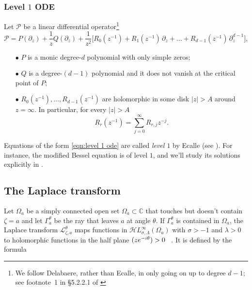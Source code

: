 \documentclass{article}
\theoremstyle{plain}
\newcommand{\C}{\mathbb{C}}
\let\Re\relax
\DeclareMathOperator{\Re}{Re}
\newcommand{\laplace}{\mathcal{L}}
\newcommand{\singexp}[2]{\mathcal{H}L^\infty_{#1, #2}}
\begin{document}
\subsubsection{Level $1$ ODE}\label{sec:level 1 ODE}

Let $\mathcal{P}$ be a linear differential operator\footnote{ We follow Delabaere, rather than Ecalle, in only going on up to degree $d-1$; see footnote~1 in \S 5.2.2.1 of \cite{diverg-resurg-iii}}
\begin{equation}\label{eqn:level 1 ode}
\mathcal{P} = P(\partial_z) + \frac{1}{z} Q(\partial_z) + \frac{1}{z^2}\big[ R_0(z^{-1}) + R_1(z^{-1})\,\partial_z + \ldots + R_{d-1}(z^{-1})\,\partial_z^{d-1} \big],
\end{equation}

\begin{enumerate}
\item[$\bullet$] $P$ is a monic degree-$d$ polynomial with only simple zeros; 
\item[$\bullet$] $Q$ is a degree-$(d-1)$ polynomial and it does not vanish at the critical point of $P$;
\item[$\bullet$] $R_0(z^{-1}), \ldots, R_{d-1}(z^{-1})$ are holomorphic in some disk $|z| > A$ around $z = \infty$. In particular, for every $|z|>A$
\[ R_r(z^{-1}) = \sum_{j=0}^\infty R_{r,j} z^{-j}. \]
\end{enumerate}

Equations of the form \eqref{eqn:level 1 ode} are called {\em level $1$} by Ecalle (see \cite[Section 2.1]{EcalleIII}). For instance, the modified Bessel equation is of level $1$, and we'll study its solutions explicitly in \cite{borel_reg}. 

\subsection{The Laplace transform}


Let $\Omega_{a}$ be a simply connected open set $\Omega_a\subset\C$ that touches but doesn't contain $\zeta=a$ and let $\Gamma_a^\theta$ be the ray that leaves $a$ at angle $\theta$. If $\Gamma_a^\theta$ is contained in $\Omega_a$, the Laplace transform $\laplace_{\zeta, a}^{\theta} $ maps functions in $\singexp{\sigma}{\Lambda}(\Omega_a)$ with $\sigma>-1$ and $\lambda>0$ to holomorphic functions in the half plane $\Re(z e^{-i\theta}) > 0$ ~\cite[Section 5.6]{diverg-resurg-i}. It is defined by the formula
\end{document}
